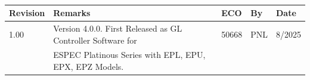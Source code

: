  \\
\vspace{0.125in}
\begin{center}
\begin{tabular}{|l l l l l|}
\hline
{\bf{Revision}} & {\bf{Remarks}} & {\bf{ECO}} & {\bf{By}} & {\bf{Date}}         \\ [0.5ex]
\hline \hline
1.00  & Version 4.0.0. First Released as GL Controller Software for & 50668  & PNL & 8/2025 \\
      & ESPEC Platinous Series with EPL, EPU, EPX, EPZ Models.           &  &     &         \\ [1ex] 
\hline 
\end{tabular}
\end{center}
